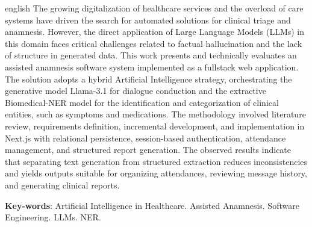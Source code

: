 \begin{resumo}[Abstract]
 \begin{otherlanguage*}{english}
   The growing digitalization of healthcare services and the overload of care systems have driven the search for automated solutions for clinical triage and anamnesis. However, the direct application of Large Language Models (LLMs) in this domain faces critical challenges related to factual hallucination and the lack of structure in generated data. This work presents and technically evaluates an assisted anamnesis software system implemented as a fullstack web application. The solution adopts a hybrid Artificial Intelligence strategy, orchestrating the generative model Llama-3.1 for dialogue conduction and the extractive Biomedical-NER model for the identification and categorization of clinical entities, such as symptoms and medications. The methodology involved literature review, requirements definition, incremental development, and implementation in Next.js with relational persistence, session-based authentication, attendance management, and structured report generation. The observed results indicate that separating text generation from structured extraction reduces inconsistencies and yields outputs suitable for organizing attendances, reviewing message history, and generating clinical reports.

   \vspace{\onelineskip}
 
   \noindent 
   \textbf{Key-words}: Artificial Intelligence in Healthcare. Assisted Anamnesis. Software Engineering. LLMs. NER.
 \end{otherlanguage*}
\end{resumo}
